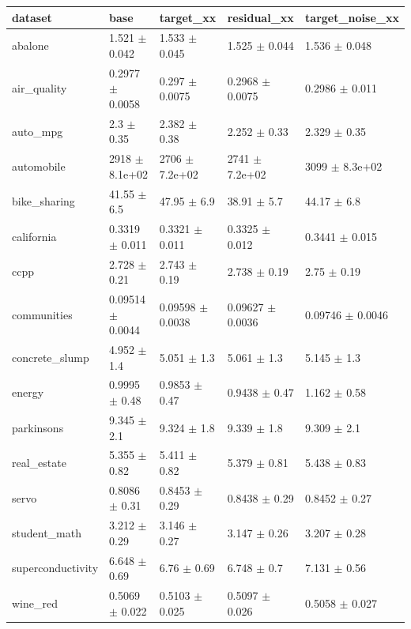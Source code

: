 \begin{tabular}{lllll}
\toprule
dataset & base & target\_xx & residual\_xx & target\_noise\_xx \\
\midrule
abalone & 1.521 $\pm$ 0.042 & 1.533 $\pm$ 0.045 & 1.525 $\pm$ 0.044 & 1.536 $\pm$ 0.048 \\
air\_quality & 0.2977 $\pm$ 0.0058 & 0.297 $\pm$ 0.0075 & 0.2968 $\pm$ 0.0075 & 0.2986 $\pm$ 0.011 \\
auto\_mpg & 2.3 $\pm$ 0.35 & 2.382 $\pm$ 0.38 & 2.252 $\pm$ 0.33 & 2.329 $\pm$ 0.35 \\
automobile & 2918 $\pm$ 8.1e+02 & 2706 $\pm$ 7.2e+02 & 2741 $\pm$ 7.2e+02 & 3099 $\pm$ 8.3e+02 \\
bike\_sharing & 41.55 $\pm$ 6.5 & 47.95 $\pm$ 6.9 & 38.91 $\pm$ 5.7 & 44.17 $\pm$ 6.8 \\
california & 0.3319 $\pm$ 0.011 & 0.3321 $\pm$ 0.011 & 0.3325 $\pm$ 0.012 & 0.3441 $\pm$ 0.015 \\
ccpp & 2.728 $\pm$ 0.21 & 2.743 $\pm$ 0.19 & 2.738 $\pm$ 0.19 & 2.75 $\pm$ 0.19 \\
communities & 0.09514 $\pm$ 0.0044 & 0.09598 $\pm$ 0.0038 & 0.09627 $\pm$ 0.0036 & 0.09746 $\pm$ 0.0046 \\
concrete\_slump & 4.952 $\pm$ 1.4 & 5.051 $\pm$ 1.3 & 5.061 $\pm$ 1.3 & 5.145 $\pm$ 1.3 \\
energy & 0.9995 $\pm$ 0.48 & 0.9853 $\pm$ 0.47 & 0.9438 $\pm$ 0.47 & 1.162 $\pm$ 0.58 \\
parkinsons & 9.345 $\pm$ 2.1 & 9.324 $\pm$ 1.8 & 9.339 $\pm$ 1.8 & 9.309 $\pm$ 2.1 \\
real\_estate & 5.355 $\pm$ 0.82 & 5.411 $\pm$ 0.82 & 5.379 $\pm$ 0.81 & 5.438 $\pm$ 0.83 \\
servo & 0.8086 $\pm$ 0.31 & 0.8453 $\pm$ 0.29 & 0.8438 $\pm$ 0.29 & 0.8452 $\pm$ 0.27 \\
student\_math & 3.212 $\pm$ 0.29 & 3.146 $\pm$ 0.27 & 3.147 $\pm$ 0.26 & 3.207 $\pm$ 0.28 \\
superconductivity & 6.648 $\pm$ 0.69 & 6.76 $\pm$ 0.69 & 6.748 $\pm$ 0.7 & 7.131 $\pm$ 0.56 \\
wine\_red & 0.5069 $\pm$ 0.022 & 0.5103 $\pm$ 0.025 & 0.5097 $\pm$ 0.026 & 0.5058 $\pm$ 0.027 \\
\bottomrule
\end{tabular}
